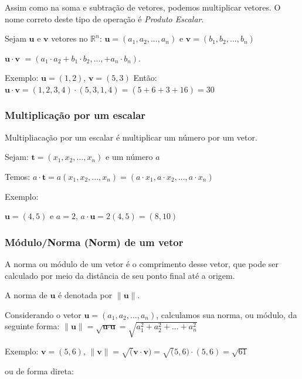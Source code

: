 \documentclass[12pt]{article}
\begin{document}
Assim como na soma e subtração de vetores, podemos multiplicar vetores. O nome correto deste tipo de operação é \textit{Produto Escalar}.

Sejam \(\textbf{u}\) e \(\textbf{v}\) vetores no \(\mathbb{R}^n\): \(\textbf{u}=(a_{1}, a_{2},...,a_{n})\) e \(\textbf{v}=(b_{1}, b_{2},...,b_{n})\)

\(\textbf{u} \cdot \textbf{v }= (a_{1} \cdot a_{2} + b_{1} \cdot b_{2} ,..., + a_{n} \cdot b_{n})\).

Exemplo: \(\textbf{u} = (1,2)\), \(\textbf{v} = (5, 3)\)
Então: \(\textbf{u} \cdot \textbf{v} = (1, 2, 3, 4) \cdot (5, 3, 1, 4) = (5 + 6 + 3 + 16) = 30\)

\subsubsection{Multiplicação por um escalar}

Multipliacação por um escalar é multiplicar um número por um vetor.

Sejam: \(\textbf{t} = (x_{1}, x_{2}, ..., x_{n})\) e um número \(\textit{a}\)

Temos: \(\textit{a}\cdot\textbf{t} = \textit{a}(x_{1}, x_{2}, ..., x_{n}) = (\textit{a} \cdot x_{1}, \textit{a} \cdot x_{2}, ..., \textit{a} \cdot x_{n})\)

Exemplo:

\(\textbf{u} = (4, 5)\) e \(\textit{a} = 2\), \(\textit{a}\cdot\textbf{u} = 2(4, 5) = (8, 10)\)

\subsubsection{Módulo/Norma (Norm) de um vetor}

A norma ou módulo de um vetor é o comprimento desse vetor, que pode ser calculado por meio da distância de seu ponto final até a origem.

A norma de \( \textbf{u} \) é denotada por \( \| \textbf{u} \| \).

Considerando o vetor \(\textbf{u} = (a_{1}, a_{2}, ..., a_{n})\), calculamos sua norma, ou módulo, da seguinte forma\cite{lipschutz-algebra, anton2012algebra}: \( \|\textbf{u}\| = \sqrt{\textbf{u} \cdot \textbf{u}} = \sqrt{a_{1}^2 + a_{2}^2 + ... + a_{n}^2} \) 

Exemplo: \(\textbf{v} = (5, 6)\), \(\|\textbf{v}\| = \sqrt(\textbf{v} \cdot \textbf{v}) = \sqrt(5,6) \cdot (5,6) = \sqrt{61}\)

ou de forma direta:
\end{document}
